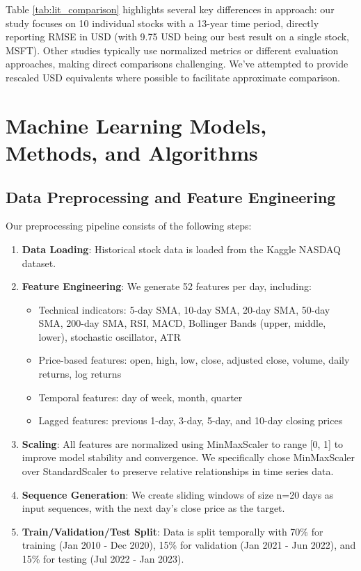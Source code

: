 \documentclass[sigconf]{acmart}
\begin{document}
Table \ref{tab:lit_comparison} highlights several key differences in approach: our study focuses on 10 individual stocks with a 13-year time period, directly reporting RMSE in USD (with 9.75 USD being our best result on a single stock, MSFT). Other studies typically use normalized metrics or different evaluation approaches, making direct comparisons challenging. We've attempted to provide rescaled USD equivalents where possible to facilitate approximate comparison.

\section{Machine Learning Models, Methods, and Algorithms}

\subsection{Data Preprocessing and Feature Engineering}

Our preprocessing pipeline consists of the following steps:

\begin{enumerate}
\item \textbf{Data Loading}: Historical stock data is loaded from the Kaggle NASDAQ dataset.
\item \textbf{Feature Engineering}: We generate 52 features per day, including:
   \begin{itemize}
   \item Technical indicators: 5-day SMA, 10-day SMA, 20-day SMA, 50-day SMA, 200-day SMA, RSI, MACD, Bollinger Bands (upper, middle, lower), stochastic oscillator, ATR
   \item Price-based features: open, high, low, close, adjusted close, volume, daily returns, log returns
   \item Temporal features: day of week, month, quarter
   \item Lagged features: previous 1-day, 3-day, 5-day, and 10-day closing prices
   \end{itemize}
\item \textbf{Scaling}: All features are normalized using MinMaxScaler to range [0, 1] to improve model stability and convergence. We specifically chose MinMaxScaler over StandardScaler to preserve relative relationships in time series data.
\item \textbf{Sequence Generation}: We create sliding windows of size n=20 days as input sequences, with the next day's close price as the target.
\item \textbf{Train/Validation/Test Split}: Data is split temporally with 70\% for training (Jan 2010 - Dec 2020), 15\% for validation (Jan 2021 - Jun 2022), and 15\% for testing (Jul 2022 - Jan 2023).
\end{enumerate}
\end{document}

